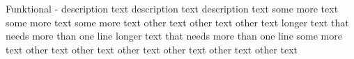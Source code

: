 
\begin{myreq}
  \threeinline
    {}
    {\reqtype Funktional}
    {\reqevent -}
  \reqdesc description text description text description text 
  \reqrat some more text some more text some more text 
  \reqorig other text other text other text 
  \reqfit longer text that needs more than one line longer text that needs more than one line
  \twoinline
    {}
    {}
  \twoinline
  {\reqdep some more text}
  {}
  \reqmater other text other text other text 
  \reqhist other text other text other text 
\end{myreq}